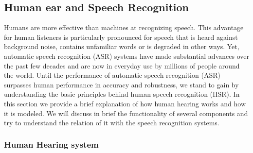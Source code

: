 \subsection{Human ear and Speech Recognition}
Humans are more effective than machines at recognizing speech. This advantage for
human listeners is particularly pronounced for speech that is heard against
background noise, contains unfamiliar words or is degraded in other ways. Yet,
automatic speech recognition (ASR) systems have made substantial advances over the
past few decades and are now in everyday use by millions of people around the world.
Until the performance of automatic speech recognition (ASR)  surpasses human
performance in accuracy and robustness, we stand to gain by understanding the basic 
principles behind human speech recognition (HSR).
In this section we provide a brief explanation of how human hearing works and 
how it is modeled. We will discuss in brief the functionality of several
components and try to understand the relation of it with the speech recognition systems.

\subsubsection{Human Hearing system}

